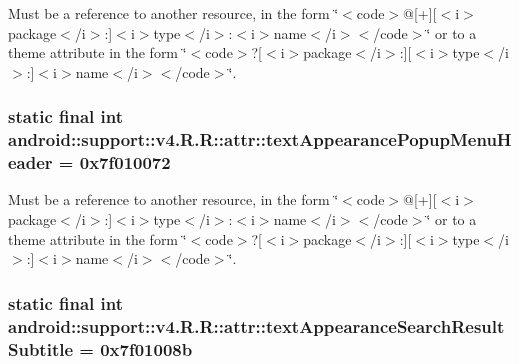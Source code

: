 Must be a reference to another resource, in the form \char`\"{}$<$code$>$@\mbox{[}+\mbox{]}\mbox{[}$<$i$>$package$<$/i$>$:\mbox{]}$<$i$>$type$<$/i$>$:$<$i$>$name$<$/i$>$$<$/code$>$\char`\"{} or to a theme attribute in the form \char`\"{}$<$code$>$?\mbox{[}$<$i$>$package$<$/i$>$:\mbox{]}\mbox{[}$<$i$>$type$<$/i$>$:\mbox{]}$<$i$>$name$<$/i$>$$<$/code$>$\char`\"{}. \hypertarget{classandroid_1_1support_1_1v4_1_1_r_1_1attr_d4d771683a13cf24cf381a9b70600b2d}{
\subsubsection[{textAppearancePopupMenuHeader}]{\setlength{\rightskip}{0pt plus 5cm}static final int android::support::v4.R.R::attr::textAppearancePopupMenuHeader = 0x7f010072}}
\label{classandroid_1_1support_1_1v4_1_1_r_1_1attr_d4d771683a13cf24cf381a9b70600b2d}


Must be a reference to another resource, in the form \char`\"{}$<$code$>$@\mbox{[}+\mbox{]}\mbox{[}$<$i$>$package$<$/i$>$:\mbox{]}$<$i$>$type$<$/i$>$:$<$i$>$name$<$/i$>$$<$/code$>$\char`\"{} or to a theme attribute in the form \char`\"{}$<$code$>$?\mbox{[}$<$i$>$package$<$/i$>$:\mbox{]}\mbox{[}$<$i$>$type$<$/i$>$:\mbox{]}$<$i$>$name$<$/i$>$$<$/code$>$\char`\"{}. \hypertarget{classandroid_1_1support_1_1v4_1_1_r_1_1attr_63f3995013d8eb35ecc25446fbd58a1e}{
\subsubsection[{textAppearanceSearchResultSubtitle}]{\setlength{\rightskip}{0pt plus 5cm}static final int android::support::v4.R.R::attr::textAppearanceSearchResultSubtitle = 0x7f01008b}}
\label{classandroid_1_1support_1_1v4_1_1_r_1_1attr_63f3995013d8eb35ecc25446fbd58a1e}



